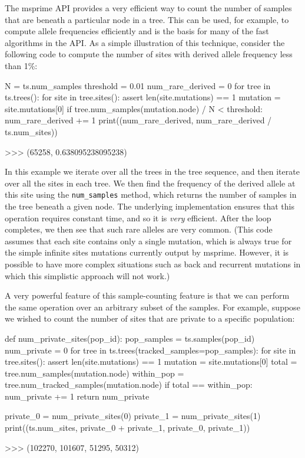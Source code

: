 \documentclass[graybox]{svmult}
\begin{document}
The msprime API provides a very efficient way to count the number of
samples that are beneath a particular node in a tree. This can be used,
for example, to compute allele frequencies efficiently and is the basis
for many of the fast algorithms in the API. As a simple illustration of
this technique, consider the following code to compute the number of
sites with derived allele frequency less than 1\%:

\begin{pythoncode}
N = ts.num_samples
threshold = 0.01
num_rare_derived = 0
for tree in ts.trees():
    for site in tree.sites():
        assert len(site.mutations) == 1
        mutation = site.mutations[0]
        if tree.num_samples(mutation.node) / N < threshold:
            num_rare_derived += 1
print((num_rare_derived, num_rare_derived / ts.num_sites))

>>> (65258, 0.638095238095238)
\end{pythoncode}

    In this example we iterate over all the trees in the tree sequence, and
then iterate over all the sites in each tree. We then find the frequency
of the derived allele at this site using the \texttt{num\_samples}
method, which returns the number of samples in the tree beneath a given
node. The underlying implementation ensures that this operation requires
constant time, and so it is \emph{very} efficient. After the loop
completes, we then see that such rare alleles are very common. (This
code assumes that each site contains only a single mutation, which is
always true for the simple infinite sites mutations currently output by
msprime. However, it is possible to have more complex situations such as
back and recurrent mutations in which this simplistic approach will not
work.)

A very powerful feature of this sample-counting feature is that we can
perform the same operation over an arbitrary subset of the samples. For
example, suppose we wished to count the number of sites that are private
to a specific population:

\begin{pythoncode}
def num_private_sites(pop_id):
    pop_samples = ts.samples(pop_id)
    num_private = 0
    for tree in ts.trees(tracked_samples=pop_samples):
        for site in tree.sites():
            assert len(site.mutations) == 1
            mutation = site.mutations[0]
            total = tree.num_samples(mutation.node)
            within_pop = tree.num_tracked_samples(mutation.node)
            if total == within_pop:
                num_private += 1
    return num_private

private_0 = num_private_sites(0)
private_1 = num_private_sites(1)
print((ts.num_sites, private_0 + private_1, private_0, private_1))

>>> (102270, 101607, 51295, 50312)
\end{pythoncode}
\end{document}
